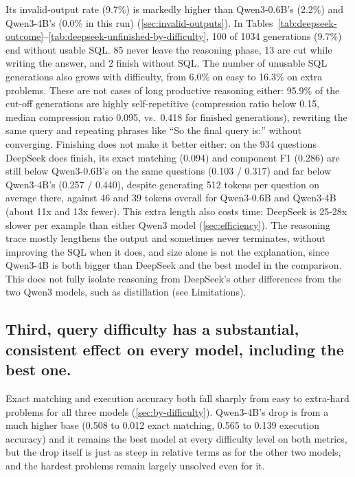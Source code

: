 Its invalid-output rate (9.7\%) is markedly higher than Qwen3-0.6B's (2.2\%) and Qwen3-4B's (0.0\% in this run) (\ref{sec:invalid-outputs}). In Tables~\ref{tab:deepseek-outcome}--\ref{tab:deepseek-unfinished-by-difficulty}, 100 of 1034 generations (9.7\%) end without usable SQL. 85 never leave the reasoning phase, 13 are cut while writing the answer, and 2 finish without SQL. The number of unusable SQL generations also grows with difficulty, from 6.0\% on easy to 16.3\% on extra problems. These are not cases of long productive reasoning either: 95.9\% of the cut-off generations are highly self-repetitive (compression ratio below 0.15, median compression ratio 0.095, vs.\ 0.418 for finished generations), rewriting the same query and repeating phrases like ``So the final query is:'' without converging. Finishing does not make it better either: on the 934 questions DeepSeek does finish, its exact matching (0.094) and component F1 (0.286) are still below Qwen3-0.6B's on the same questions (0.103 / 0.317) and far below Qwen3-4B's (0.257 / 0.440), despite generating 512 tokens per question on average there, against 46 and 39 tokens overall for Qwen3-0.6B and Qwen3-4B (about 11x and 13x fewer). This extra length also costs time: DeepSeek is 25-28x slower per example than either Qwen3 model (\ref{sec:efficiency}). The reasoning trace mostly lengthens the output and sometimes never terminates, without improving the SQL when it does, and size alone is not the explanation, since Qwen3-4B is both bigger than DeepSeek and the best model in the comparison. This does not fully isolate reasoning from DeepSeek's other differences from the two Qwen3 models, such as distillation (see Limitations).

\subsection{Third, query difficulty has a substantial, consistent effect on every model, including the best one.}
\label{sec:rq1-finding-difficulty}

Exact matching and execution accuracy both fall sharply from easy to extra-hard problems for all three models (\ref{sec:by-difficulty}). Qwen3-4B's drop is from a much higher base (0.508 to 0.012 exact matching, 0.565 to 0.139 execution accuracy) and it remains the best model at every difficulty level on both metrics, but the drop itself is just as steep in relative terms as for the other two models, and the hardest problems remain largely unsolved even for it.

